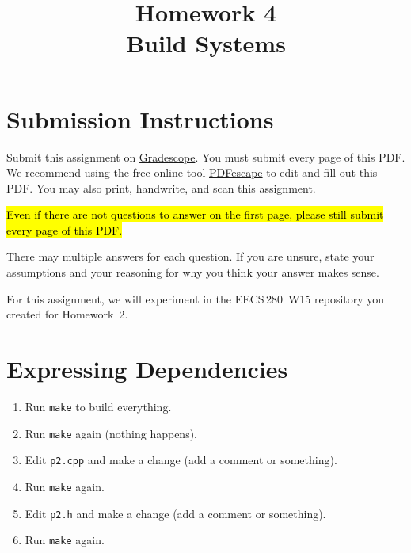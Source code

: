 \documentclass{article}
\begin{document}
\fancyfoot[C]{\color{gray} \thepage~/~\pageref*{LastPage}}
\pagestyle{fancyplain}



\title{\textbf{Homework 4\\Build Systems}}
\author{\textbf{\color{red}{Due: Saturday, October 8, 10:00PM (Hard Deadline)}}}
\date{}
\maketitle


\section*{Submission Instructions}
Submit this assignment on \href{https://gradescope.com/courses/3499}{Gradescope}.
You must submit every page of this PDF.
We recommend using the free online tool \href{https://www.pdfescape.com}{PDFescape}
to edit and fill out this PDF.
You may also print, handwrite, and scan this assignment.

\hl{Even if there are not questions to answer on the first page, please still
submit every page of this PDF.}

There may multiple answers for each question. If you are unsure,
state your assumptions and your reasoning for why you think your answer
makes sense.



\newpage
\begin{mdframed}\centering
For this assignment, we will experiment in the EECS\,280~W15 repository you
created for Homework~2.
\end{mdframed}

\section{Expressing Dependencies}
\begin{enumerate}\small
  \item Run \texttt{make} to build everything.
  \item Run \texttt{make} again (nothing happens).
  \item Edit \texttt{p2.cpp} and make a change (add a comment or something).
  \item Run \texttt{make} again.
  \item Edit \texttt{p2.h} and make a change (add a comment or something).
  \item Run \texttt{make} again.
\end{enumerate}
\end{document}
